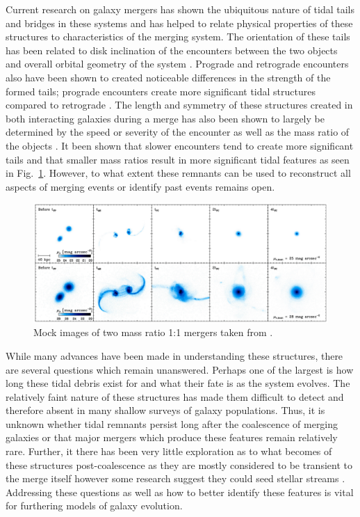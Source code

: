 \documentclass[fleqn,usenatbib]{mnras}
\begin{document}
Current research on galaxy mergers has shown the ubiquitous nature of tidal tails and bridges in these systems and has helped to relate physical properties of these structures to characteristics of the merging system. 
The orientation of these tails has been related to disk inclination of the encounters between the two objects and overall orbital geometry of the system \cite{Mihos_2004}. 
Prograde and retrograde encounters also have been shown to created noticeable differences in the strength of the formed tails; prograde encounters create more significant tidal structures compared to retrograde \cite{Privon_Barnes_Evans_Hibbard_Yun_Mazzarella_Armus_Surace_2013}. 
The length and symmetry of these structures created in both interacting galaxies during a merge has also been shown to largely be determined by the speed or severity of the encounter as well as the mass ratio of the objects \cite{Ji_Peirani_Yi_2014,Toomre_Toomre_1972}. 
It been shown that slower encounters tend to create more significant tails and that smaller mass ratios result in more significant tidal features as seen in Fig.~\ref{fig:Ji2014_fig}. 
However, to what extent these remnants can be used to reconstruct all aspects of merging events or identify past events remains open.

\begin{figure}
	\includegraphics[width=\columnwidth]{Ji2014_fig.png}
    \caption{Mock images of two mass ratio 1:1 mergers taken from \cite{Ji_Peirani_Yi_2014}.}
    \label{fig:Ji2014_fig}
\end{figure}

While many advances have been made in understanding these structures, there are several questions which remain unanswered. 
Perhaps one of the largest is how long these tidal debris exist for and what their fate is as the system evolves. 
The relatively faint nature of these structures has made them difficult to detect and therefore absent in many shallow surveys of galaxy populations. 
Thus, it is unknown whether tidal remnants persist long after the coalescence of merging galaxies or that major mergers which produce these features remain relatively rare. 
Further, it there has been very little exploration as to what becomes of these structures post-coalescence as they are mostly considered to be transient to the merge itself however some research suggest they could seed stellar streams \cite{Wang_Hammer_Athanassoula_Puech_Yang_Flores_2012}. 
Addressing these questions as well as how to better identify these features is vital for furthering models of galaxy evolution.
\end{document}
